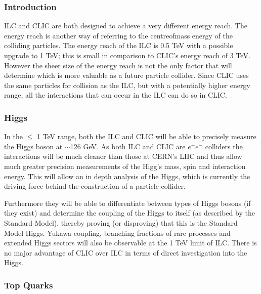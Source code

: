 \subsubsection{Introduction}
ILC and CLIC are both designed to achieve a very different energy reach. The energy reach is another way of referring to the centre\textendash of\textendash mass energy of the colliding particles. The energy reach of the ILC is 0.5 TeV with a possible upgrade to 1 TeV; this is small in comparison to CLIC's energy reach of 3 TeV. However the sheer size of the energy reach is not the only factor that will determine which is more valuable as a future particle collider. Since CLIC uses the same particles for collision as the ILC, but with a potentially higher energy range, all the interactions that can occur in the ILC can do so in CLIC.


\subsubsection{Higgs}

In the $\leq$ 1 TeV range, both the ILC and CLIC will be able to precisely measure the Higgs boson at $\sim$126 GeV. As both ILC and CLIC are $e^+e^-$ colliders the interactions will be much cleaner than those at CERN's LHC and thus allow much greater precision measurements of the Higg's mass, spin and interaction energy. This will allow an in depth analysis of the Higgs, which is currently the driving force behind the construction of a particle collider. 

Furthermore they will be able to differentiate between types of Higgs bosons (if they exist) and determine the coupling of the Higgs to itself (as described by the Standard Model), thereby proving (or disproving) that this is the Standard Model Higgs. Yukawa coupling, branching fractions of rare processes and extended Higgs sectors will also be observable at the 1 TeV limit of ILC. There is no major advantage of CLIC over ILC in terms of direct investigation into the Higgs.

\subsubsection{Top Quarks}

